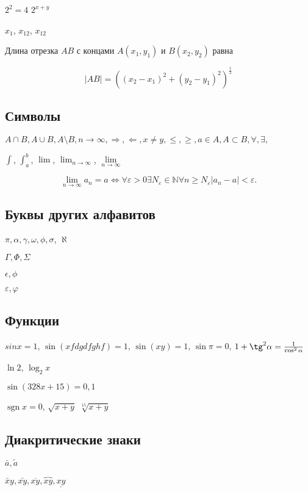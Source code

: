 \documentclass[a4paper,12pt]{article} %
\DeclareMathOperator{\sgn}{\mathop{sgn}}
\begin{document}
$2^2=4$ $2^{x+y}$

$x_1$, $x_12$, $x_{12}$

Длина отрезка $AB$ с концами $A\left(x_1, y_1\right) $ и $B\left(x_2, y_2\right) $ равна

$$
|AB|=\left( \left( x_2-x_1\right)^2+\left(y_2-y_1 \right)^2  \right) ^{\frac{1}{2}}
$$

\subsection{Символы}

$A \cap B, A\cup B,  A\setminus B, n\to\infty,  \Rightarrow, \Longleftarrow, x\ne y, \le, \ge, a\in A, A\subset B, \forall, \exists,$

 $\int$,  $\int_{a}^{b}$, $\lim$, $\lim_{n\to\infty}$, $\lim\limits_{n\to\infty}$
 
 $$
 \lim\limits_{n\to\infty}a_n=a \Longleftrightarrow \forall \varepsilon>0 \exists N_{\varepsilon}\in\mathbb{N} \forall n\ge N_{\varepsilon} \left|a_n-a\right|<\varepsilon.
 $$

\subsection{Буквы других алфавитов}

$\pi, \alpha, \gamma, \omega, \phi, \sigma$, $\aleph$

$\Gamma, \Phi, \Sigma$

$\epsilon, \phi$

$\varepsilon, \varphi$

\subsection{Функции}

$ sin x=1 $, %
$ \sin (xfdgdfghf)=1$, %
$\sin(xy)=1$, $\sin\pi=0$, $1+\tg^2\alpha=\frac{1}{\cos^2\alpha}$

 $\ln2$, $\log_2x$
 
$\sin (328x + 15) = 0,1$


$\sgn x=0$, $\sqrt{x+y}$ $\sqrt[15]{x+y}$

\subsection{Диакритические знаки}

$\bar a, \tilde{a}$

$\bar xy,\bar{xy}, \overline{xy}, \overbrace{xy},  \underline{xy}$
\end{document}

